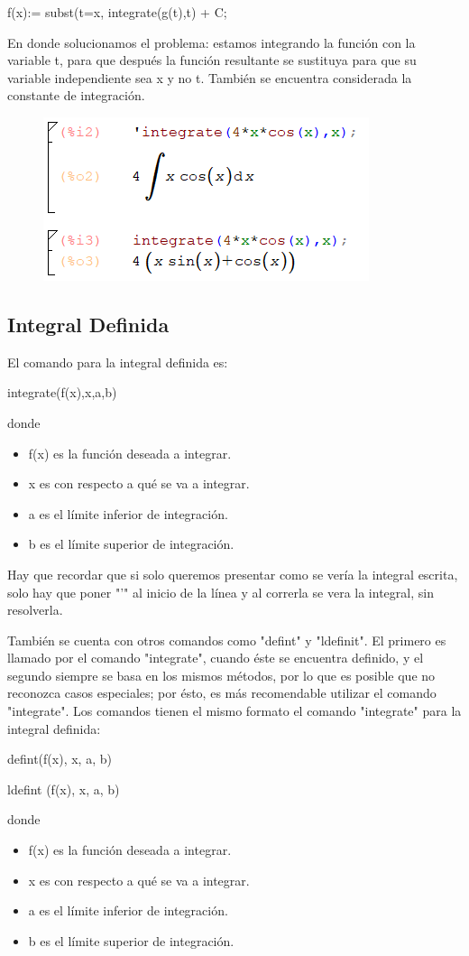 \documentclass[a4paper]{article}
\begin{document}
\begin{center}
f(x):= subst(t=x, integrate(g(t),t) + C;
\end{center}

En donde solucionamos el problema: estamos integrando la función con la variable t, para que después la función resultante se sustituya para que su variable independiente sea x y no t. También se encuentra considerada la constante de integración. 

\begin{figure}[h!]
  \centering
  \includegraphics[width=0.4\linewidth]{indef_ej.PNG}
\end{figure}

\subsection{Integral Definida}

El comando para la integral definida es:

\begin{center}
integrate(f(x),x,a,b)
\end{center}

donde
\begin{itemize}
\item f(x) es la función deseada a integrar.
\item x es con respecto a qué se va a integrar. 
\item a es el límite inferior de integración.
\item b es el límite superior de integración.
\end{itemize}

Hay que recordar que si solo queremos presentar como se vería la integral escrita, solo hay que poner "'" al inicio de la línea y al correrla se vera la integral, sin resolverla.

\bigskip

También se cuenta con otros comandos como "defint" y "ldefinit". El primero es llamado por el comando "integrate", cuando éste se encuentra definido, y el segundo siempre se basa en los mismos métodos, por lo que es posible que no reconozca casos especiales; por ésto, es más recomendable utilizar el comando "integrate". Los comandos tienen el mismo formato el comando "integrate" para la integral definida:
\begin{center}
defint(f(x), x, a, b)

ldefint (f(x), x, a, b)
\end{center}
donde
\begin{itemize}
\item f(x) es la función deseada a integrar.
\item x es con respecto a qué se va a integrar. 
\item a es el límite inferior de integración.
\item b es el límite superior de integración.
\end{itemize}
\end{document}
